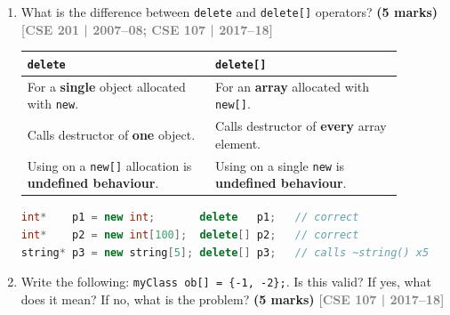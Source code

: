 \documentclass[12pt,a3paper]{article}
\newcommand{\yr}[1]{\hfill\textcolor{gray}{\small\textbf{[#1]}}}
\newcommand{\mk}[1]{\textcolor{orange!70!black}{\small\textbf{(#1 marks)}}}
\begin{document}
\begin{enumerate}
\begin{tcolorbox}[enhanced,breakable,ansbox,colback=cE!4,colframe=cE,
  boxrule=0.8pt,arc=5pt,
  title={\textbf{Answer --- Output of Point program}},
  fonttitle=\bfseries\color{white},colbacktitle=cE]
\end{tcolorbox}

\item What is the difference between \texttt{delete} and \texttt{delete[]} operators? \mk{5}
\yr{CSE 201 | 2007--08; CSE 107 | 2017--18}


\begin{tcolorbox}[enhanced,breakable,ansbox,colback=cE!4,colframe=cE,
  boxrule=0.8pt,arc=5pt,
  title={\textbf{Answer --- delete vs delete[]}},
  fonttitle=\bfseries\color{white},colbacktitle=cE]

\begin{center}
\small
\begin{tabular}{@{}p{0.44\linewidth}p{0.44\linewidth}@{}}
\toprule
\textbf{\texttt{delete}} & \textbf{\texttt{delete[]}} \\
\midrule
For a \textbf{single} object allocated with \texttt{new}. &
For an \textbf{array} allocated with \texttt{new[]}. \\[3pt]
Calls destructor of \textbf{one} object. &
Calls destructor of \textbf{every} array element. \\[3pt]
Using on a \texttt{new[]} allocation is \textbf{undefined behaviour}. &
Using on a single \texttt{new} is \textbf{undefined behaviour}. \\
\bottomrule
\end{tabular}
\end{center}

\begin{lstlisting}[language=C++]
int*    p1 = new int;       delete   p1;   // correct
int*    p2 = new int[100];  delete[] p2;   // correct
string* p3 = new string[5]; delete[] p3;   // calls ~string() x5
\end{lstlisting}

\end{tcolorbox}

\item Write the following: \texttt{myClass ob[] = \{-1, -2\};}. Is this valid? If yes, what does it mean? If no, what is the problem? \mk{5}
\yr{CSE 107 | 2017--18}


\begin{tcolorbox}[enhanced,breakable,ansbox,colback=cE!4,colframe=cE,
  boxrule=0.8pt,arc=5pt,
  title={\textbf{Answer --- myClass ob[] = \{-1, -2\} --- valid?}},
  fonttitle=\bfseries\color{white},colbacktitle=cE]


\end{tcolorbox}
\end{enumerate}
\end{document}
